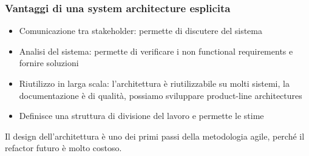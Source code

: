 \documentclass[11pt]{article}
\begin{document}
\subsubsection{Vantaggi di una system architecture esplicita}
\begin{itemize}
    \item Comunicazione tra stakeholder: permette di discutere del sistema
    \item Analisi del sistema: permette di verificare i non functional requirements e fornire soluzioni
    \item Riutilizzo in larga scala: l'architettura è riutilizzabile su molti sistemi, la documentazione è di qualità, possiamo sviluppare product-line architectures 
    \item Definisce una struttura di divisione del lavoro e permette le stime
\end{itemize}
Il design dell'architettura è uno dei primi passi della metodologia agile, perché il refactor futuro è molto costoso.
\end{document}
